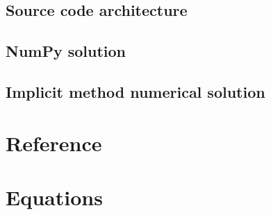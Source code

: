     \subsection{Source code architecture}
    \subsection{NumPy solution}
    \subsection{Implicit method numerical solution}

\section{Reference}



\section{Equations}




%
%

%
